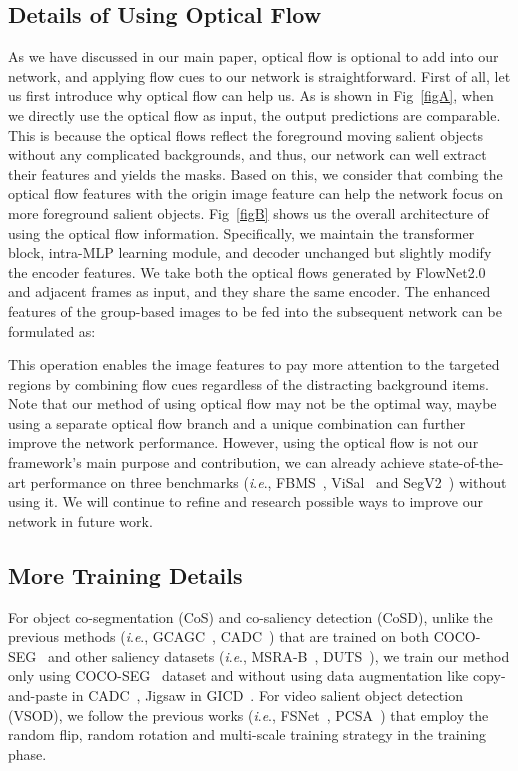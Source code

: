\documentclass[journal]{IEEEtran}
\newcommand{\ie}{\textit{i}.\textit{e}., }
\begin{document}
\subsection{Details of Using Optical Flow}
As we have discussed in our main paper, optical flow is optional to add into our network, and applying flow cues to our network is straightforward.
First of all, let us first introduce why optical flow can help us. As is
shown in Fig~\ref{figA}, when we directly use the optical flow as input, the output predictions are comparable. This is because the optical flows reflect the foreground moving salient objects without any complicated backgrounds, and thus, our network can well extract their features and yields the masks. 
Based on this, we consider that combing the optical flow features with the origin image feature can help the network focus on more foreground salient objects. Fig~\ref{figB} shows us the overall architecture of using the optical flow information.
Specifically, we maintain the transformer block, intra-MLP learning module, and decoder unchanged but slightly modify the encoder features. We take both the optical flows generated by FlowNet2.0~\cite{ilg2017flownet} and adjacent frames as input, and they share the same encoder.
The enhanced features of the group-based images to be fed into the subsequent network can be formulated as:



This operation enables the image features to pay more attention to the targeted regions by combining flow cues regardless of the distracting background items.
Note that our method of using optical flow may not be the optimal way, maybe using a separate optical flow branch and a unique combination can further improve the network performance. However, using the optical flow is not our framework's main purpose and contribution, we can already achieve state-of-the-art performance on three benchmarks (\ie FBMS~\cite{ochs2013segmentation}, ViSal~\cite{wang2015consistent} and SegV2~\cite{li2013video}) without using it.
We will continue to refine and research possible ways to improve our network in future work.



\subsection{More Training Details}
For object co-segmentation (CoS) and co-saliency detection (CoSD), unlike the previous methods (\ie GCAGC~\cite{zhang2020adaptive}, CADC~\cite{zhang2021summarize}) that are trained on both COCO-SEG~\cite{lin2014microsoft} and other saliency datasets (\ie MSRA-B~\cite{liu2010learning}, DUTS~\cite{wang2017learning}),
we train our method only using COCO-SEG~\cite{lin2014microsoft} dataset and without using data augmentation like copy-and-paste in CADC~\cite{zhang2021summarize}, Jigsaw in GICD~\cite{zhang2020gradient}.
For video salient object detection (VSOD), we follow the previous works (\ie FSNet~\cite{ji2021full}, PCSA~\cite{gu2020pyramid}) that employ the random flip, random rotation and multi-scale  training strategy in the training phase.
\end{document}
